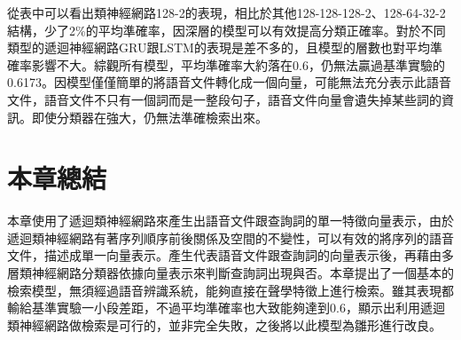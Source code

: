 從表中可以看出類神經網路128-2的表現，相比於其他128-128-128-2、128-64-32-2結構，少了2\%的平均準確率，因深層的模型可以有效提高分類正確率。對於不同類型的遞迴神經網路GRU跟LSTM的表現是差不多的，且模型的層數也對平均準確率影響不大。綜觀所有模型，平均準確率大約落在0.6，仍無法贏過基準實驗的0.6173。因模型僅僅簡單的將語音文件轉化成一個向量，可能無法充分表示此語音文件，語音文件不只有一個詞而是一整段句子，語音文件向量會遺失掉某些詞的資訊。即使分類器在強大，仍無法準確檢索出來。

\section{本章總結}
本章使用了遞迴類神經網路來產生出語音文件跟查詢詞的單一特徵向量表示，由於遞迴類神經網路有著序列順序前後關係及空間的不變性，可以有效的將序列的語音文件，描述成單一向量表示。產生代表語音文件跟查詢詞的向量表示後，再藉由多層類神經網路分類器依據向量表示來判斷查詢詞出現與否。本章提出了一個基本的檢索模型，無須經過語音辨識系統，能夠直接在聲學特徵上進行檢索。雖其表現都輸給基準實驗一小段差距，不過平均準確率也大致能夠達到0.6，顯示出利用遞迴類神經網路做檢索是可行的，並非完全失敗，之後將以此模型為雛形進行改良。
